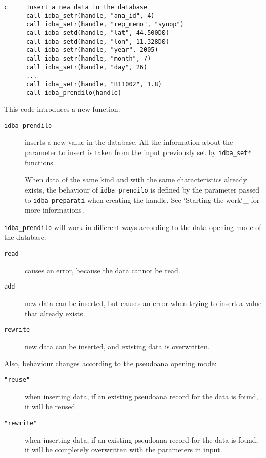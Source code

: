 \documentclass[draft,12pt,a4paper,twoside]{book}
\begin{document}
\begin{verbatim}
c     Insert a new data in the database
      call idba_setr(handle, "ana_id", 4)
      call idba_setr(handle, "rep_memo", "synop")
      call idba_setd(handle, "lat", 44.500D0)
      call idba_setd(handle, "lon", 11.328D0)
      call idba_setr(handle, "year", 2005)
      call idba_setr(handle, "month", 7)
      call idba_setr(handle, "day", 26)
      ...
      call idba_setr(handle, "B11002", 1.8)
      call idba_prendilo(handle)
\end{verbatim}

This code introduces a new function:

\begin{description}
\item[{\tt idba\_prendilo}]
  inserts a new value in the database.  All the information about the parameter
  to insert is taken from the input previously set by {\tt idba\_set*} functions.

  When data of the same kind and with the same characteristics already exists,
  the behaviour of {\tt idba\_prendilo} is defined by the parameter passed to
  {\tt idba\_preparati} when creating the handle.  See `Starting the work`\_ for
  more informations.
\end{description}

{\tt idba\_prendilo} will work in different ways according to the data opening
mode of the database:

\begin{description}
\item[{\tt read}]
  causes an error, because the data cannot be read.
\item[{\tt add}]
  new data can be inserted, but causes an error when trying to insert a value
  that already exists.
\item[{\tt rewrite}]
  new data can be inserted, and existing data is overwritten.
\end{description}

Also, behaviour changes according to the pseudoana opening mode:

\begin{description}
\item[{\tt "reuse"}] when inserting data, if an existing pseudoana record for
	       the data is found, it will be reused.
\item[{\tt "rewrite"}] when inserting data, if an existing pseudoana record for
	     the data is found, it will be completely overwritten with
	     the parameters in input.
\end{description}
\end{document}
